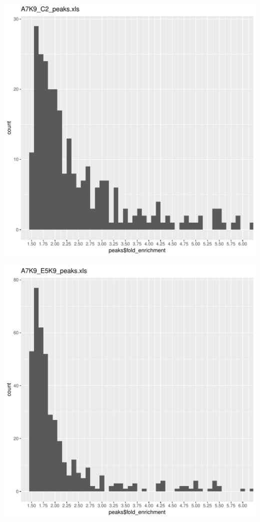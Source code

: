 \documentclass{article}\usepackage[]{graphicx}\usepackage[]{color}
\makeatletter
\def\maxwidth{ %
  \ifdim\Gin@nat@width>\linewidth
    \linewidth
  \else
    \Gin@nat@width
  \fi
}
\newenvironment{knitrout}{}{} %
\makeatother
\begin{document}
\begin{knitrout}
\includegraphics[width=\maxwidth]{figure/unnamed-chunk-2-12} 

\includegraphics[width=\maxwidth]{figure/unnamed-chunk-2-13} 


\end{knitrout}
\end{document}
